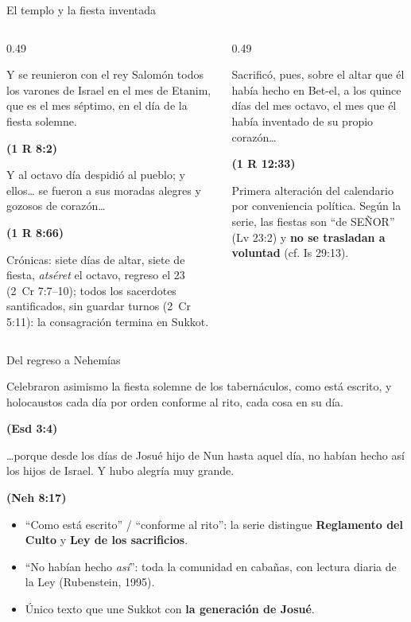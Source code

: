 \documentclass[hyperref={bookmarks=false},aspectratio=169]{beamer}
\newcommand{\SENOR}{S{\fontsize{0.78em}{1em}\selectfont EÑOR}}
\newcommand{\fuente}[1]{\par\hfill{\upshape\bfseries\footnotesize\textcolor{tierraroja}{#1}}}
\newcommand{\destacar}[1]{\textbf{\textcolor{tierraroja}{#1}}}
\begin{document}
\begin{frame}{El templo y la fiesta inventada}
\begin{columns}[t,onlytextwidth]
\begin{column}{0.49\textwidth}
\begin{cita}Y se reunieron con el rey Salomón todos los varones de Israel en el mes de Etanim, que es el mes séptimo, en el día de la fiesta solemne.\fuente{(1 R 8:2)}\end{cita}
\begin{cita}Y al octavo día despidió al pueblo; y ellos\ldots{} se fueron a sus moradas alegres y gozosos de corazón\ldots\fuente{(1 R 8:66)}\end{cita}
\scriptsize Crónicas: siete días de altar, siete de fiesta, \emph{atséret} el octavo, regreso el 23 (2~Cr 7:7--10); todos los sacerdotes santificados, sin guardar turnos (2~Cr 5:11): la consagración termina en Sukkot.
\end{column}
\begin{column}{0.49\textwidth}
\begin{cita}Sacrificó, pues, sobre el altar que él había hecho en Bet-el, a los quince días del mes octavo, el mes que él había inventado de su propio corazón\ldots\fuente{(1 R 12:33)}\end{cita}
\scriptsize Primera alteración del calendario por conveniencia política. Según la serie, las fiestas son ``de \SENOR'' (Lv 23:2) y \destacar{no se trasladan a voluntad} (cf. Is 29:13).
\end{column}
\end{columns}
\end{frame}

\begin{frame}{Del regreso a Nehemías}
\begin{cita}Celebraron asimismo la fiesta solemne de los tabernáculos, como está escrito, y holocaustos cada día por orden conforme al rito, cada cosa en su día.\fuente{(Esd 3:4)}\end{cita}
\begin{cita}\ldots{}porque desde los días de Josué hijo de Nun hasta aquel día, no habían hecho así los hijos de Israel. Y hubo alegría muy grande.\fuente{(Neh 8:17)}\end{cita}
\small\begin{itemize}
\item ``Como está escrito'' / ``conforme al rito'': la serie distingue \destacar{Reglamento del Culto} y \destacar{Ley de los sacrificios}.
\item ``No habían hecho \emph{así}'': toda la comunidad en cabañas, con lectura diaria de la Ley (Rubenstein, 1995).
\item Único texto que une Sukkot con \destacar{la generación de Josué}.
\end{itemize}
\end{frame}
\end{document}
